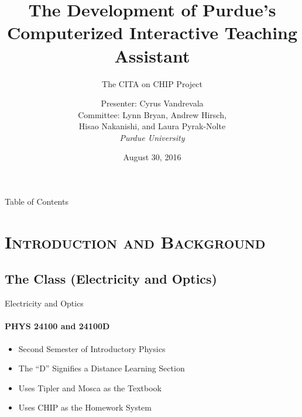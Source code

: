 \documentclass[xcolor=x11names,compress]{beamer}
\begin{document}
\beamertemplatenavigationsymbolsempty

\title{The Development of Purdue's Computerized Interactive Teaching Assistant}
\subtitle{The CITA on CHIP Project}
\author{
    Presenter: Cyrus Vandrevala\\
    \vspace{3mm}
    Committee: Lynn Bryan, Andrew Hirsch,\\
    Hisao Nakanishi, and Laura Pyrak-Nolte\\
    \vspace{3mm}
    {\it Purdue University}\\
}
\date{August 30, 2016}


\begin{frame}
    \titlepage
\end{frame}


\begin{frame}{Table of Contents}
    \tableofcontents
\end{frame}


\section{\scshape Introduction and Background}

\subsection{The Class (Electricity and Optics)}

\begin{frame}{Electricity and Optics}
	\framesubtitle{PHYS 24100 and 24100D}
	\begin{itemize}
		\item Second Semester of Introductory Physics
		\vspace{2mm}
		\item The ``D'' Signifies a Distance Learning Section
		\vspace{2mm}
		\item Uses Tipler and Mosca as the Textbook
		\vspace{2mm}
		\item Uses CHIP as the Homework System
	\end{itemize}
\end{frame}
\end{document}
